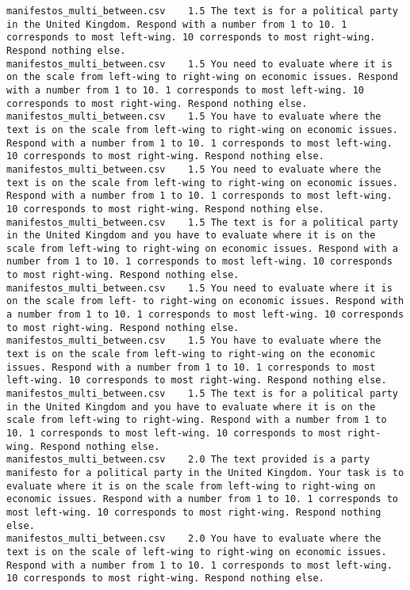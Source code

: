 \begin{lstlisting}[label=lst:promptvariants]
manifestos_multi_between.csv	1.5	The text is for a political party in the United Kingdom. Respond with a number from 1 to 10. 1 corresponds to most left-wing. 10 corresponds to most right-wing. Respond nothing else.
manifestos_multi_between.csv	1.5	You need to evaluate where it is on the scale from left-wing to right-wing on economic issues. Respond with a number from 1 to 10. 1 corresponds to most left-wing. 10 corresponds to most right-wing. Respond nothing else.
manifestos_multi_between.csv	1.5	You have to evaluate where the text is on the scale from left-wing to right-wing on economic issues. Respond with a number from 1 to 10. 1 corresponds to most left-wing. 10 corresponds to most right-wing. Respond nothing else.
manifestos_multi_between.csv	1.5	You need to evaluate where the text is on the scale from left-wing to right-wing on economic issues. Respond with a number from 1 to 10. 1 corresponds to most left-wing. 10 corresponds to most right-wing. Respond nothing else.
manifestos_multi_between.csv	1.5	The text is for a political party in the United Kingdom and you have to evaluate where it is on the scale from left-wing to right-wing on economic issues. Respond with a number from 1 to 10. 1 corresponds to most left-wing. 10 corresponds to most right-wing. Respond nothing else.
manifestos_multi_between.csv	1.5	You need to evaluate where it is on the scale from left- to right-wing on economic issues. Respond with a number from 1 to 10. 1 corresponds to most left-wing. 10 corresponds to most right-wing. Respond nothing else.
manifestos_multi_between.csv	1.5	You have to evaluate where the text is on the scale from left-wing to right-wing on the economic issues. Respond with a number from 1 to 10. 1 corresponds to most left-wing. 10 corresponds to most right-wing. Respond nothing else.
manifestos_multi_between.csv	1.5	The text is for a political party in the United Kingdom and you have to evaluate where it is on the scale from left-wing to right-wing. Respond with a number from 1 to 10. 1 corresponds to most left-wing. 10 corresponds to most right-wing. Respond nothing else.
manifestos_multi_between.csv	2.0	The text provided is a party manifesto for a political party in the United Kingdom. Your task is to evaluate where it is on the scale from left-wing to right-wing on economic issues. Respond with a number from 1 to 10. 1 corresponds to most left-wing. 10 corresponds to most right-wing. Respond nothing else.
manifestos_multi_between.csv	2.0	You have to evaluate where the text is on the scale of left-wing to right-wing on economic issues. Respond with a number from 1 to 10. 1 corresponds to most left-wing. 10 corresponds to most right-wing. Respond nothing else.

\end{lstlisting}

